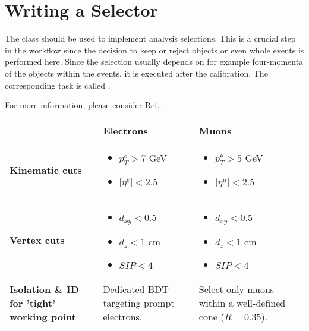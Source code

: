 \section{Writing a Selector}\label{sec:selector}

The  class should be used to implement analysis selections.
This is a crucial step in the workflow since the decision to keep or reject objects or even whole events is performed here.
Since the selection usually depends on for example four-momenta of the objects within the events, it is executed after the calibration.
The corresponding task is called .

For more information, please consider Ref.~\cite{cf_repo}.

\renewcommand{\arraystretch}{1.5}
\begin{table}[h!]
    \centering
    \begin{tabular}{|m{4cm}|m{5cm}|m{5.5cm}|}
    \hline
    & \textbf{Electrons} & \textbf{Muons} \\ \hline
    \textbf{Kinematic cuts} &
    \begin{itemize}[leftmargin=*]
    \item $p_T^e > 7$ GeV
    \item $|\eta^e| < 2.5$
    \end{itemize} &
    \begin{itemize}[leftmargin=*]
        \item $p_T^\mu > 5$ GeV
        \item $|\eta^\mu| < 2.5$
    \end{itemize} \\ \hline
    \textbf{Vertex cuts} &
    \begin{itemize}[leftmargin=*]
        \item $d_{xy} < 0.5$
        \item $d_z < 1$ cm
        \item $SIP < 4$
    \end{itemize} &
    \begin{itemize}[leftmargin=*]
        \item $d_{xy} < 0.5$
        \item $d_z < 1$ cm
        \item $SIP < 4$
    \end{itemize} \\ \hline
    \textbf{Isolation \& ID for \newline 'tight' working point} & Dedicated BDT targeting \newline prompt electrons. & Select only muons within \newline a well-defined cone ($R=0.35$). \\ \hline
    \end{tabular}
    \label{leptonSelection}
\end{table}

